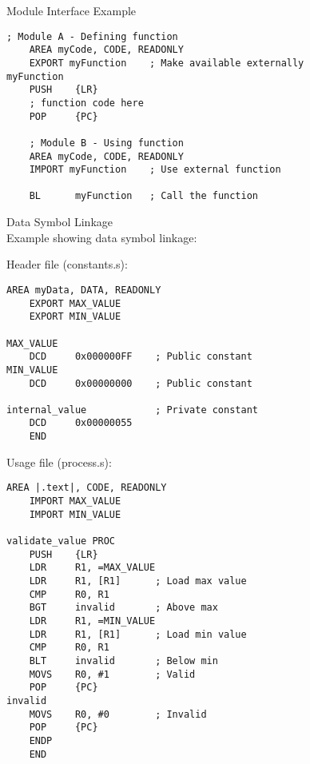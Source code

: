 \begin{example2}{Module Interface Example}
\begin{lstlisting}[language=armasm, style=basesmol]
    ; Module A - Defining function
    AREA myCode, CODE, READONLY
    EXPORT myFunction    ; Make available externally
myFunction
    PUSH    {LR}
    ; function code here
    POP     {PC}
    
    ; Module B - Using function
    AREA myCode, CODE, READONLY
    IMPORT myFunction    ; Use external function
    
    BL      myFunction   ; Call the function
\end{lstlisting}
\end{example2}

\begin{example2}{Data Symbol Linkage}\\
Example showing data symbol linkage:

Header file (constants.s):
\begin{lstlisting}[language=armasm, style=basesmol]
    AREA myData, DATA, READONLY
    EXPORT MAX_VALUE
    EXPORT MIN_VALUE
    
MAX_VALUE
    DCD     0x000000FF    ; Public constant
MIN_VALUE
    DCD     0x00000000    ; Public constant
    
internal_value            ; Private constant
    DCD     0x00000055
    END
\end{lstlisting}

Usage file (process.s):
\begin{lstlisting}[language=armasm, style=basesmol]
    AREA |.text|, CODE, READONLY
    IMPORT MAX_VALUE
    IMPORT MIN_VALUE
    
validate_value PROC
    PUSH    {LR}
    LDR     R1, =MAX_VALUE
    LDR     R1, [R1]      ; Load max value
    CMP     R0, R1
    BGT     invalid       ; Above max
    LDR     R1, =MIN_VALUE
    LDR     R1, [R1]      ; Load min value
    CMP     R0, R1
    BLT     invalid       ; Below min
    MOVS    R0, #1        ; Valid
    POP     {PC}
invalid
    MOVS    R0, #0        ; Invalid
    POP     {PC}
    ENDP
    END
\end{lstlisting}
\end{example2}